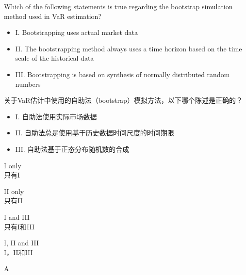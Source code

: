 \documentclass{article}
\newcounter{question} %
\begin{document}
\begin{question}
    Which of the following statements is true regarding the bootstrap simulation method used in VaR estimation? 
    \begin{itemize}
    \item I. Bootstrapping uses actual market data 
    \item II. The bootstrapping method always uses a time horizon based on the time scale of the historical data 
    \item III. Bootstrapping is based on synthesis of normally distributed random numbers
    \end{itemize}
    关于VaR估计中使用的自助法（bootstrap）模拟方法，以下哪个陈述是正确的？
    \begin{itemize}
    \item I. 自助法使用实际市场数据
    \item II. 自助法总是使用基于历史数据时间尺度的时间期限
    \item III. 自助法基于正态分布随机数的合成
    \end{itemize}
\end{question}

\begin{choices}
    \item I only\\只有I
    \item II only\\只有II
    \item I and III\\只有I和III
    \item I, II and III\\I，II和III
\end{choices}

\begin{correctanswer}
    A
\end{correctanswer}
\end{document}
